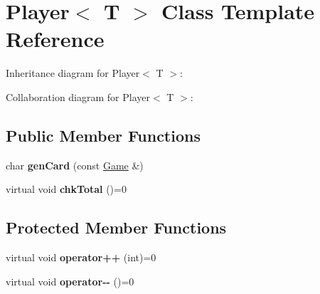 \hypertarget{class_player}{}\section{Player$<$ T $>$ Class Template Reference}
\label{class_player}


Inheritance diagram for Player$<$ T $>$\+:


Collaboration diagram for Player$<$ T $>$\+:
\subsection*{Public Member Functions}
\begin{DoxyCompactItemize}
\item 
\mbox{\label{class_player_a945ac1d44644a6b78a6d80f57a6b7e8e}} 
char {\bfseries gen\+Card} (const \mbox{\hyperlink{class_game}{Game}} \&)
\item 
\mbox{\label{class_player_a5e3919460b04e086261e04843a906248}} 
virtual void {\bfseries chk\+Total} ()=0
\end{DoxyCompactItemize}
\subsection*{Protected Member Functions}
\begin{DoxyCompactItemize}
\item 
\mbox{\label{class_player_a765ffde62f4ca315f5080d23b7a89df6}} 
virtual void {\bfseries operator++} (int)=0
\item 
\mbox{\label{class_player_a34001e45bcbd5aa4c039b9d73a8c3ede}} 
virtual void {\bfseries operator-\/-\/} ()=0
\end{DoxyCompactItemize}
